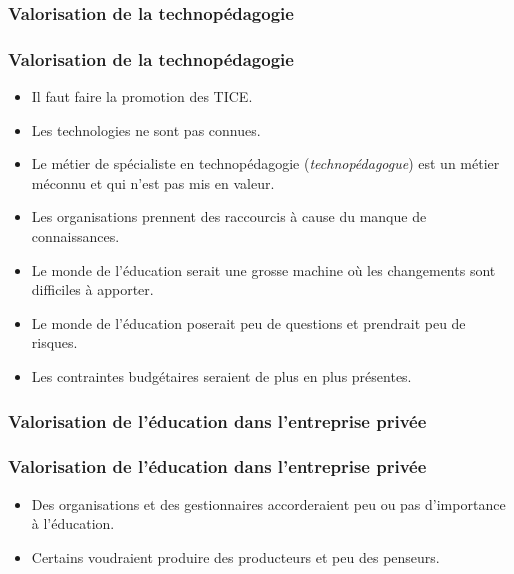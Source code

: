 						
													
				\subsubsection{Valorisation de la technopédagogie} 
						\begin{frame}[allowframebreaks]
						\frametitle{Valorisation de la technopédagogie}
                        			
                        			\begin{itemize}
                        			\item Il faut faire la promotion des TICE.
                        			\item Les technologies ne sont pas connues.
                        			\item Le métier de spécialiste en technopédagogie (\textit{technopédagogue}) est un métier méconnu et qui n’est pas mis en valeur.
                        			\item Les organisations prennent des raccourcis à cause du manque de connaissances. 
                        			\pagebreak
                        			\item Le monde de l’éducation serait une grosse machine où les changements sont difficiles à apporter.
                        			\item Le monde de l’éducation poserait peu de questions et prendrait peu de risques. 
                        			\item Les contraintes budgétaires seraient de plus en plus présentes. 
						\end{itemize}
						
						\end{frame}	
						
					\subsubsection{Valorisation de l'éducation dans l'entreprise privée} 
						\begin{frame}[allowframebreaks]
						\frametitle{Valorisation de l'éducation dans l'entreprise privée}
                        			
                        			\begin{itemize}
                        			\item Des organisations et des gestionnaires accorderaient peu ou pas d’importance à l’éducation. 
                        			\item Certains voudraient produire des producteurs et peu des penseurs. 
                        			
						\end{itemize}
						\end{frame}	
						
